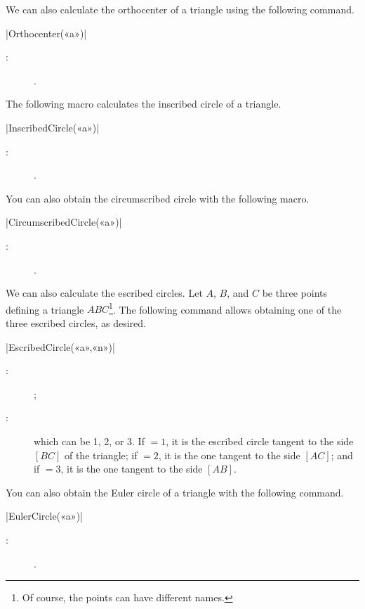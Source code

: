 \documentclass[a4paper,english]{article}
\begin{document}
We can also calculate the orthocenter of a triangle using the following command.
\begin{colourband}
\macro|Orthocenter(«a»)|
\begin{description}
  \item[:]  .
\end{description}
\end{colourband}

The following macro calculates the inscribed circle of a triangle.
\begin{colourband}
\macro|InscribedCircle(«a»)|
\begin{description}
  \item[:]  .
\end{description}
\end{colourband}

You can also obtain the circumscribed circle with the following macro.
\begin{colourband}
\macro|CircumscribedCircle(«a»)|
\begin{description}
  \item[:]  .
\end{description}
\end{colourband}
We can also calculate the escribed circles. Let \(A\), \(B\), and \(C\) be three points
defining a triangle \(ABC\)\footnote{Of course, the points can have different names.}. 
The following command allows obtaining one of the three escribed circles, as desired.
\begin{colourband}
\macro|EscribedCircle(«a»,«n»)|
\begin{description}
  \item[:]  ;
  \item[:]   which can be 1, 2, or 3. If $=1$, it is
  the escribed circle tangent to the side \([BC]\) of the triangle; if $=2$, it is
  the one tangent to the side \([AC]\); and if $=3$, it is the one tangent to the side \([AB]\).
\end{description}
\end{colourband}
You can also obtain the Euler circle of a triangle with the following command.
\begin{colourband}
\macro|EulerCircle(«a»)|
\begin{description}
  \item[:]  .
\end{description}
\end{colourband}
\end{document}
